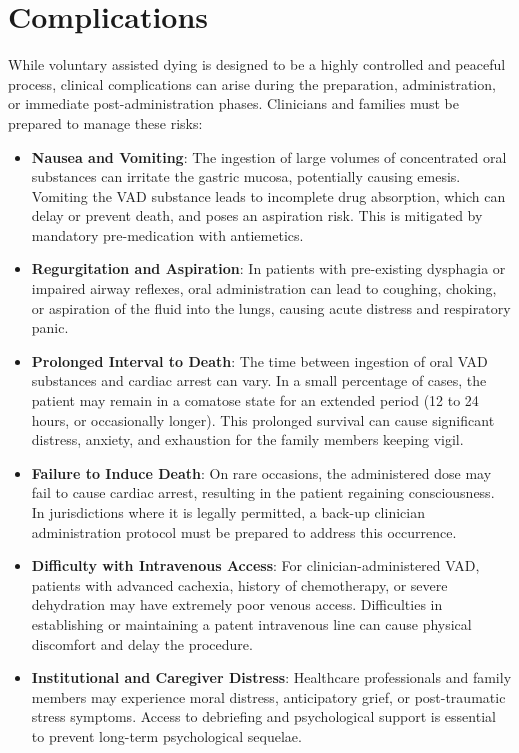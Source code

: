 \section*{Complications}
While voluntary assisted dying is designed to be a highly controlled and peaceful process, clinical complications can arise during the preparation, administration, or immediate post-administration phases. Clinicians and families must be prepared to manage these risks:
\begin{itemize}
    \item \textbf{Nausea and Vomiting}: The ingestion of large volumes of concentrated oral substances can irritate the gastric mucosa, potentially causing emesis. Vomiting the VAD substance leads to incomplete drug absorption, which can delay or prevent death, and poses an aspiration risk. This is mitigated by mandatory pre-medication with antiemetics.
    \item \textbf{Regurgitation and Aspiration}: In patients with pre-existing dysphagia or impaired airway reflexes, oral administration can lead to coughing, choking, or aspiration of the fluid into the lungs, causing acute distress and respiratory panic.
    \item \textbf{Prolonged Interval to Death}: The time between ingestion of oral VAD substances and cardiac arrest can vary. In a small percentage of cases, the patient may remain in a comatose state for an extended period (12 to 24 hours, or occasionally longer). This prolonged survival can cause significant distress, anxiety, and exhaustion for the family members keeping vigil.
    \item \textbf{Failure to Induce Death}: On rare occasions, the administered dose may fail to cause cardiac arrest, resulting in the patient regaining consciousness. In jurisdictions where it is legally permitted, a back-up clinician administration protocol must be prepared to address this occurrence.
    \item \textbf{Difficulty with Intravenous Access}: For clinician-administered VAD, patients with advanced cachexia, history of chemotherapy, or severe dehydration may have extremely poor venous access. Difficulties in establishing or maintaining a patent intravenous line can cause physical discomfort and delay the procedure.
    \item \textbf{Institutional and Caregiver Distress}: Healthcare professionals and family members may experience moral distress, anticipatory grief, or post-traumatic stress symptoms. Access to debriefing and psychological support is essential to prevent long-term psychological sequelae.
\end{itemize}

